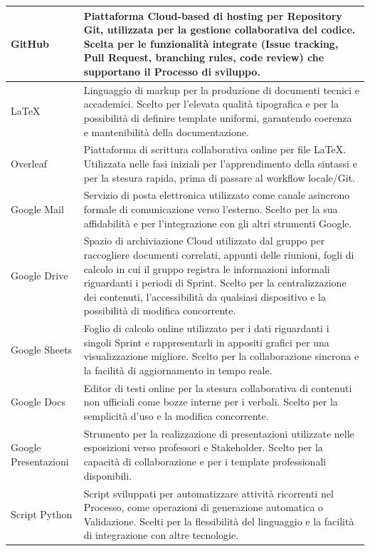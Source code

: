 \documentclass[a4paper,12pt]{article}
\begin{document}
\begin{center}
\begin{longtable}{| m{3cm} | m{} |}
\rowcolor{gray!20}
\centering GitHub & Piattaforma Cloud-based di hosting per Repository Git, utilizzata per la gestione collaborativa del codice. Scelta per le funzionalità integrate (Issue tracking, Pull Request, branching rules, code review) che supportano il Processo di sviluppo.\\
\hline
\rowcolor{white}
\centering \LaTeX & Linguaggio di markup per la produzione di documenti tecnici e accademici. Scelto per l’elevata qualità tipografica e per la possibilità di definire template uniformi, garantendo coerenza e mantenibilità della documentazione.\\
\hline
\rowcolor{gray!20}
\centering Overleaf & Piattaforma di scrittura collaborativa online per file LaTeX. Utilizzata nelle fasi iniziali per l'apprendimento della sintassi e per la stesura rapida, prima di passare al workflow locale/Git.\\
\hline
\rowcolor{white}
\centering Google Mail & Servizio di posta elettronica utilizzato come canale asincrono formale di comunicazione verso l’esterno. Scelto per la sua affidabilità e per l’integrazione con gli altri strumenti Google.\\
\hline
\rowcolor{gray!20}
\centering Google Drive & Spazio di archiviazione Cloud utilizzato dal gruppo per raccogliere documenti correlati, appunti delle riunioni, fogli di calcolo in cui il gruppo registra le informazioni informali riguardanti i periodi di Sprint. Scelto per la centralizzazione dei contenuti, l’accessibilità da qualsiasi dispositivo e la possibilità di modifica concorrente.\\
\hline
\rowcolor{white}
\centering Google Sheets & Foglio di calcolo online utilizzato per i dati riguardanti i singoli Sprint e rappresentarli in appositi grafici per una visualizzazione migliore. Scelto per la collaborazione sincrona e la facilità di aggiornamento in tempo reale.\\
\hline
\rowcolor{gray!20}
\centering Google Docs & Editor di testi online per la stesura collaborativa di contenuti non ufficiali come bozze interne per i verbali. Scelto per la semplicità d’uso e la modifica concorrente.\\
\hline
\rowcolor{white}
\centering Google Presentazioni & Strumento per la realizzazione di presentazioni utilizzate nelle esposizioni verso professori e Stakeholder. Scelto per la capacità di collaborazione e per i template professionali disponibili.\\
\hline
\rowcolor{gray!20}
\centering Script Python & Script sviluppati per automatizzare attività ricorrenti nel Processo, come operazioni di generazione automatica o Validazione. Scelti per la flessibilità del linguaggio e la facilità di integrazione con altre tecnologie.\\

\end{longtable}
\end{center}
\end{document}

